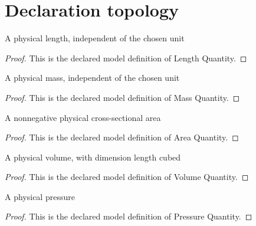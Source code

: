 \section{Declaration topology}
\begin{definition}
  \label{def:physics:phyx-mini-0360:phyxminiproblems-problemphyxmini0360-lengthquantity}
  A physical length, independent of the chosen unit
\end{definition}
\begin{proof}
  This is the declared model definition of Length Quantity.
\end{proof}
\begin{definition}
  \label{def:physics:phyx-mini-0360:phyxminiproblems-problemphyxmini0360-massquantity}
  A physical mass, independent of the chosen unit
\end{definition}
\begin{proof}
  This is the declared model definition of Mass Quantity.
\end{proof}
\begin{definition}
  \label{def:physics:phyx-mini-0360:phyxminiproblems-problemphyxmini0360-areaquantity}
  A nonnegative physical cross-sectional area
\end{definition}
\begin{proof}
  This is the declared model definition of Area Quantity.
\end{proof}
\begin{definition}
  \label{def:physics:phyx-mini-0360:phyxminiproblems-problemphyxmini0360-volumequantity}
  A physical volume, with dimension length cubed
\end{definition}
\begin{proof}
  This is the declared model definition of Volume Quantity.
\end{proof}
\begin{definition}
  \label{def:physics:phyx-mini-0360:phyxminiproblems-problemphyxmini0360-pressurequantity}
  A physical pressure
\end{definition}
\begin{proof}
  This is the declared model definition of Pressure Quantity.
\end{proof}
